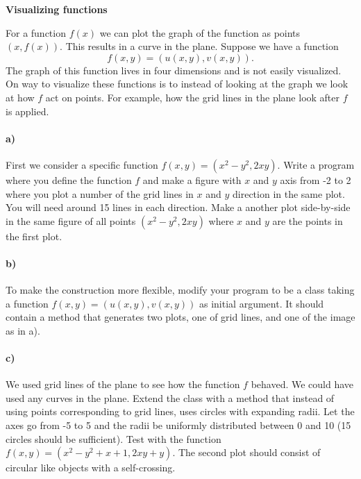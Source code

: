 \begin{Problem}{\textbf{Visualizing functions}}

\noindent For a function $f(x)$ we can plot the graph of the function as points $(x,f(x))$.
This results in a curve in the plane. Suppose we have a function
 \begin{equation*}
 f(x,y)=(u(x,y),v(x,y)).
 \end{equation*}
The graph of this function lives in four dimensions and is not easily visualized.
On way to visualize these functions is to instead of looking at the graph we look
at how $f$ act on points. For example, how the grid lines in the plane look
after $f$ is applied.

\paragraph{a)}
First we consider a specific function $f(x,y)=(x^2-y^2,2xy)$.
Write a program where you define the function $f$
and make a figure with $x$ and $y$ axis from -2 to 2 where you plot a number of
the grid lines in $x$ and $y$ direction in the same plot. You will need around 15 lines
in each direction. Make a another plot side-by-side in the same figure of all points
$(x^2-y^2,2xy)$ where $x$ and $y$ are the points in the first plot.

\paragraph{b)}
To make the construction more flexible, modify your program to be a class  taking
a function $f(x,y)=(u(x,y),v(x,y))$ as initial argument. It should contain
a method  that generates two plots, one of grid lines,
and one of the image as in a).

\paragraph{c)}
We used grid lines of the plane to see how the function $f$ behaved. We could have
used any curves in the plane. Extend the class with a method  that instead of using
points corresponding to grid lines, uses circles with expanding radii. Let the
axes go from -5 to 5 and the radii be uniformly distributed between
0 and 10 (15 circles should be sufficient). Test with the function $f(x,y)=(x^2-y^2+x+1,2xy+y)$.
The second plot should consist of circular like objects with a self-crossing.


\end{Problem}
